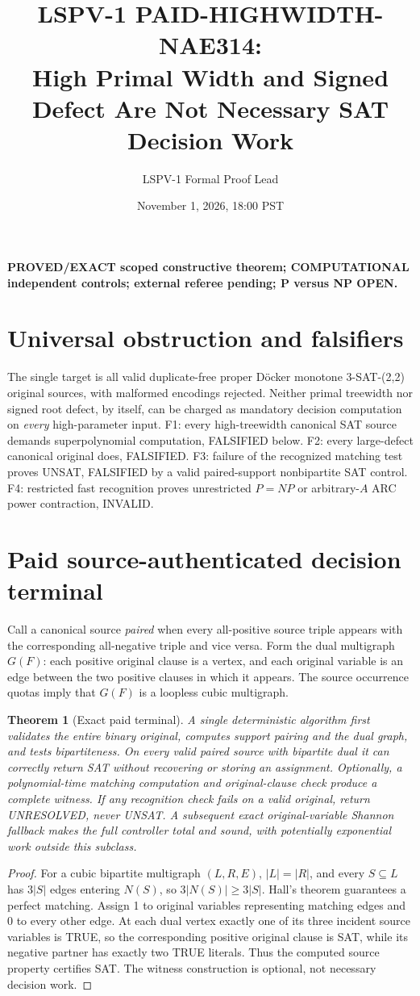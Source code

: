 \documentclass[11pt]{article}
\title{LSPV-1 PAID-HIGHWIDTH-NAE314:\\ High Primal Width and Signed Defect Are Not Necessary SAT Decision Work}
\author{LSPV-1 Formal Proof Lead}
\date{November 1, 2026, 18:00 PST}
\newtheorem{theorem}{Theorem}
\begin{document}
\maketitle
\noindent\textbf{PROVED/EXACT scoped constructive theorem; COMPUTATIONAL independent controls; external referee pending; P versus NP OPEN.}
\section{Universal obstruction and falsifiers}
The single target is all valid duplicate-free proper D\"ocker monotone 3-SAT-(2,2) original sources, with malformed encodings rejected. Neither primal treewidth nor signed root defect, by itself, can be charged as mandatory decision computation on \emph{every} high-parameter input. F1: every high-treewidth canonical SAT source demands superpolynomial computation, FALSIFIED below. F2: every large-defect canonical original does, FALSIFIED. F3: failure of the recognized matching test proves UNSAT, FALSIFIED by a valid paired-support nonbipartite SAT control. F4: restricted fast recognition proves unrestricted $P=NP$ or arbitrary-$A$ ARC power contraction, INVALID.
\section{Paid source-authenticated decision terminal}
Call a canonical source \emph{paired} when every all-positive source triple appears with the corresponding all-negative triple and vice versa. Form the dual multigraph $G(F)$: each positive original clause is a vertex, and each original variable is an edge between the two positive clauses in which it appears. The source occurrence quotas imply that $G(F)$ is a loopless cubic multigraph.
\begin{theorem}[Exact paid terminal]
A single deterministic algorithm first validates the entire binary original, computes support pairing and the dual graph, and tests bipartiteness. On every valid paired source with bipartite dual it can correctly return SAT \emph{without} recovering or storing an assignment. Optionally, a polynomial-time matching computation and original-clause check produce a complete witness. If any recognition check fails on a valid original, return UNRESOLVED, never UNSAT. A subsequent exact original-variable Shannon fallback makes the full controller total and sound, with potentially exponential work outside this subclass.
\end{theorem}
\begin{proof}
For a cubic bipartite multigraph $(L,R,E)$, $|L|=|R|$, and every $S\subseteq L$ has $3|S|$ edges entering $N(S)$, so $3|N(S)|\ge3|S|$. Hall's theorem guarantees a perfect matching. Assign 1 to original variables representing matching edges and 0 to every other edge. At each dual vertex exactly one of its three incident source variables is TRUE, so the corresponding positive original clause is SAT, while its negative partner has exactly two TRUE literals. Thus the computed source property certifies SAT. The witness construction is optional, not necessary decision work. \end{proof}
\end{document}
